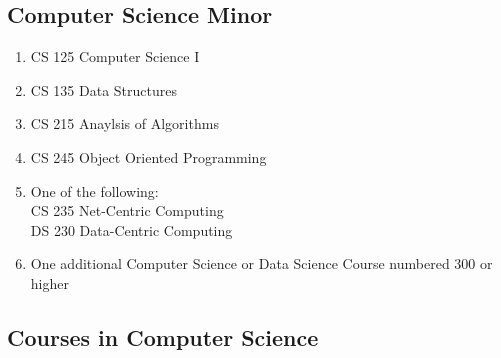 \documentclass[
  letterpaper,
]{scrbook}
\providecommand{\tightlist}{%
  \setlength{\itemsep}{0pt}\setlength{\parskip}{0pt}}
\begin{document}
\subsection{Computer Science Minor}\label{computer-science-minor}

\begin{enumerate}
\def\labelenumi{\arabic{enumi}.}
\tightlist
\item
  CS 125 Computer Science I
\item
  CS 135 Data Structures
\item
  CS 215 Anaylsis of Algorithms
\item
  CS 245 Object Oriented Programming
\item
  One of the following:\\
  CS 235 Net-Centric Computing\\
  DS 230 Data-Centric Computing\\
\item
  One additional Computer Science or Data Science Course numbered 300 or
  higher
\end{enumerate}

\subsection{Courses in Computer
Science}\label{courses-in-computer-science}
\end{document}
